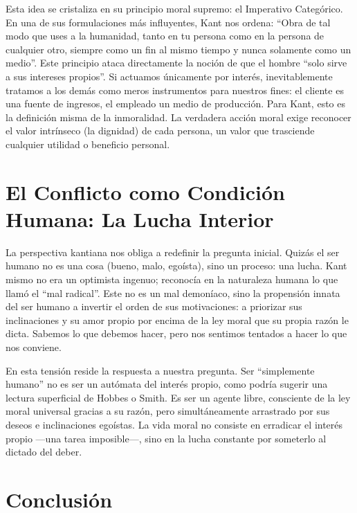 \documentclass[12pt, a4paper]{article}
\begin{document}
Esta idea se cristaliza en su principio moral supremo: el Imperativo Categórico. En una de sus formulaciones más influyentes, Kant nos ordena: ``Obra de tal modo que uses a la humanidad, tanto en tu persona como en la persona de cualquier otro, siempre como un fin al mismo tiempo y nunca solamente como un medio''. Este principio ataca directamente la noción de que el hombre ``solo sirve a sus intereses propios''. Si actuamos únicamente por interés, inevitablemente tratamos a los demás como meros instrumentos para nuestros fines: el cliente es una fuente de ingresos, el empleado un medio de producción. Para Kant, esto es la definición misma de la inmoralidad. La verdadera acción moral exige reconocer el valor intrínseco (la dignidad) de cada persona, un valor que trasciende cualquier utilidad o beneficio personal.

\section*{El Conflicto como Condición Humana: La Lucha Interior}

La perspectiva kantiana nos obliga a redefinir la pregunta inicial. Quizás el ser humano no es una cosa (bueno, malo, egoísta), sino un proceso: una lucha. Kant mismo no era un optimista ingenuo; reconocía en la naturaleza humana lo que llamó el ``mal radical''. Este no es un mal demoníaco, sino la propensión innata del ser humano a invertir el orden de sus motivaciones: a priorizar sus inclinaciones y su amor propio por encima de la ley moral que su propia razón le dicta. Sabemos lo que debemos hacer, pero nos sentimos tentados a hacer lo que nos conviene.

En esta tensión reside la respuesta a nuestra pregunta. Ser ``simplemente humano'' no es ser un autómata del interés propio, como podría sugerir una lectura superficial de Hobbes o Smith. Es ser un agente libre, consciente de la ley moral universal gracias a su razón, pero simultáneamente arrastrado por sus deseos e inclinaciones egoístas. La vida moral no consiste en erradicar el interés propio —una tarea imposible—, sino en la lucha constante por someterlo al dictado del deber.

\section*{Conclusión}
\end{document}
